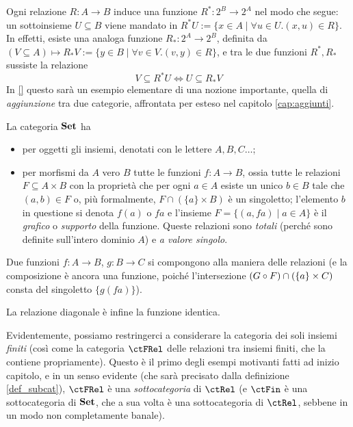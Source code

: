 \begin{remark}\label{klext_delle_relazioni}
	Ogni relazione \(R : A\to B\) induce una funzione \(R^* : 2^B\to 2^A\) nel modo che segue: un sottoinsieme \(U\subseteq B\) viene mandato in \(R^*U:=\{x\in A\mid \forall u\in U.(x,u)\in R\}\). In effetti, esiste una analoga funzione \(R_* : 2^A\to 2^B\), definita da \((V\subseteq A) \mapsto R_*V:= \{y\in B\mid \forall v\in V.(v,y)\in R\}\), e tra le due funzioni \(R^*, R_*\) sussiste la relazione
	\[V\subseteq R^*U \iff U\subseteq R_*V\label{aggiunti_in_disguise}\]
	In \ref{} questo sarà un esempio elementare di una nozione importante, quella di \emph{aggiunzione} tra due categorie, affrontata per esteso nel capitolo \ref{cap:aggiunti}.
\end{remark}
\begin{example}\label{ex_cat_insiemi}
	La categoria \(\mathbf{Set}\) ha
	\begin{itemize}
		\item per oggetti gli insiemi, denotati con le lettere \(A,B,C\dots\);
		\item per morfismi da \(A\) vero \(B\) tutte le funzioni \(f : A\to B\), ossia tutte le relazioni \(F\subseteq A\times B\) con la proprietà che per ogni \(a\in A\) esiste un unico \(b\in B\) tale che \((a,b)\in F\) o, più formalmente, \(F\cap(\{a\}\times B)\) è un singoletto; l'elemento \(b\) in questione si denota \(f(a)\) o \(fa\) e l'insieme \(F = \{(a,fa)\mid a\in A\}\) è il \emph{grafico} o \emph{supporto} della funzione. Queste relazioni sono \emph{totali} (perché sono definite sull'intero dominio \(A\)) e \emph{a valore singolo}.
	\end{itemize}
	Due funzioni \(f : A\to B\), \(g : B\to C\) si compongono alla maniera delle relazioni (e la composizione è ancora una funzione, poiché l'intersezione \((G\circ F)\cap (\{a\}\times C)\) consta del singoletto \(\{g(fa)\}\)).

	La relazione diagonale è infine la funzione identica.
\end{example}
Evidentemente, possiamo restringerci a considerare la categoria dei soli insiemi \emph{finiti} (così come la categoria \(\ctFRel\) delle relazioni tra insiemi finiti, che la contiene propriamente). Questo è il primo degli esempi motivanti fatti ad inizio capitolo, e in un senso evidente (che sarà precisato dalla definizione \ref{def_subcat}), \(\ctFRel\) è una \emph{sottocategoria} di \(\ctRel\) (e \(\ctFin\) è una sottocategoria di \(\mathbf{Set}\), che a sua volta è una sottocategoria di \(\ctRel\), sebbene in un modo non completamente banale).
